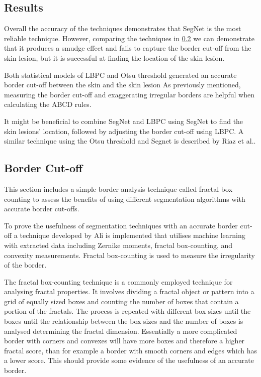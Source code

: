 \begin{figure}
    \centering
    \caption{} 
\end{figure}\label{lbpc-issues}

\subsection{Results}
Overall the accuracy of the techniques demonstrates that SegNet is the most reliable technique. However, comparing the techniques in \ref{} we can demonstrate that it produces a smudge effect and fails to capture the border cut-off from the skin lesion, but it is successful at finding the location of the skin lesion.

Both statistical models of LBPC and Otsu threshold generated an accurate border cut-off between the skin and the skin lesion As previously mentioned, measuring the border cut-off and exaggerating irregular borders are helpful when calculating the ABCD rules. 

It might be beneficial to combine SegNet and LBPC using SegNet to find the skin lesions' location, followed by adjusting the border cut-off using LBPC. A similar technique using the Otsu threshold and Segnet is described by Riaz et al.\cite{Riaz2019}.

\subsection{Border Cut-off}
This section includes a simple border analysis technique called fractal box counting to assess the benefits of using different segmentation algorithms with accurate border cut-offs.

To prove the usefulness of segmentation techniques with an accurate border cut-off a technique developed by Ali\cite{Ali2020b} is implemented that utilises machine learning with extracted data including Zernike moments, fractal box-counting, and convexity measurements. Fractal box-counting is used to measure the irregularity of the border.

The fractal box-counting technique is a commonly employed technique for analysing fractal properties. It involves dividing a fractal object or pattern into a grid of equally sized boxes and counting the number of boxes that contain a portion of the fractals. The process is repeated with different box sizes until the boxes until the relationship between the box sizes and the number of boxes is analysed determining the fractal dimension\cite{Hamburger1996}. Essentially a more complicated border with corners and convexes will have more boxes and therefore a higher fractal score, than for example a border with smooth corners and edges which has a lower score. This should provide some evidence of the usefulness of an accurate border.

